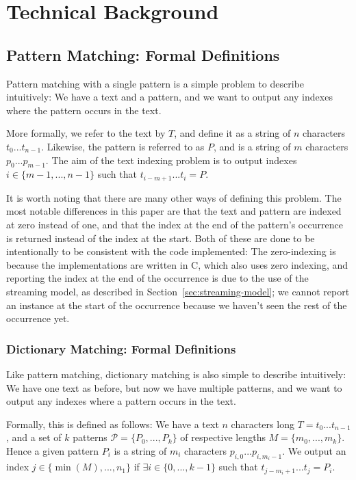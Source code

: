 \documentclass[ %
                    author={Dominic Joseph Moylett},
                    degree={MEng},
                     title={Dictionary Matching with Fingerprints},
                  subtitle={An Empirical Analysis},
                      type={research},
                      year={2015} ]{dissertation}
\begin{document}

\chapter{Technical Background}
\label{chap:technical}

\section{Pattern Matching: Formal Definitions}

Pattern matching with a single pattern is a simple problem to describe intuitively: We have a text and a pattern, and we want to output any indexes where the pattern occurs in the text.

More formally, we refer to the text by $T$, and define it as a string of $n$ characters $t_0...t_{n-1}$. Likewise, the pattern is referred to as $P$, and is a string of $m$ characters $p_0...p_{m-1}$. The aim of the text indexing problem is to output indexes $i \in \{m-1,...,n-1\}$ such that $t_{i-m+1}...t_{i} = P$.

It is worth noting that there are many other ways of defining this problem. The most notable differences in this paper are that the text and pattern are indexed at zero instead of one, and that the index at the end of the pattern's occurrence is returned instead of the index at the start. Both of these are done to be intentionally to be consistent with the code implemented: The zero-indexing is because the implementations are written in C, which also uses zero indexing, and reporting the index at the end of the occurrence is due to the use of the streaming model, as described in Section~\ref{sec:streaming-model}; we cannot report an instance at the start of the occurrence because we haven't seen the rest of the occurrence yet.

\subsection{Dictionary Matching: Formal Definitions}
\label{ssec:dict-matching:definitions}

Like pattern matching, dictionary matching is also simple to describe intuitively: We have one text as before, but now we have multiple patterns, and we want to output any indexes where a pattern occurs in the text.

Formally, this is defined as follows: We have a text $n$ characters long $T = t_0...t_{n-1}$, and a set of $k$ patterns $\mathcal{P} = \{P_0,...,P_k\}$ of respective lengths $M = \{m_0,...,m_k\}$. Hence a given pattern $P_i$ is a string of $m_i$ characters $p_{i,0}...p_{i,m_i-1}$. We output an index $j \in \{\min(M),...,n_1\}$ if $\exists i \in \{0,...,k-1\}$ such that $t_{j-m_i+1}...t_{j} = P_i$.
\end{document}
